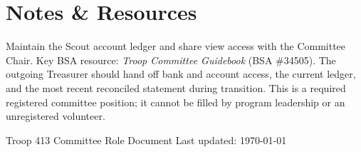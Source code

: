 \documentclass[11pt, letterpaper]{article}
\begin{document}
\vspace{0.6em}

\section{Notes \& Resources}
Maintain the Scout account ledger and share view access with the Committee Chair. Key BSA resource: \textit{Troop Committee Guidebook} (BSA \#34505). The outgoing Treasurer should hand off bank and account access, the current ledger, and the most recent reconciled statement during transition. This is a required registered committee position; it cannot be filled by program leadership or an unregistered volunteer.

\vfill
\begin{center}
  \footnotesize\color{gray}
  Troop 413 \textbullet{} Committee Role Document \textbullet{} Last updated: \today
\end{center}
\end{document}

